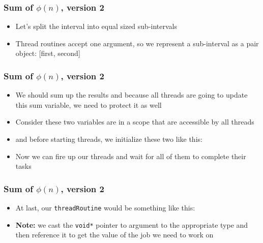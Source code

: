 \documentclass[aspectratio=43,11pt]{beamer}
\begin{document}
\begin{frame}
  \frametitle{Sum of $\phi(n)$, version 2}
  
  \begin{itemize}
    \item Let's split the interval into equal sized sub-intervals
    \item Thread routines accept one argument, so we represent a sub-interval as a
    pair object: [first, second]
  \end{itemize}
  
  
\end{frame}
\begin{frame}
  \frametitle{Sum of $\phi(n)$, version 2}
  
  \begin{itemize}
    \item We should sum up the results and because all threads are going to update this
    sum variable, we need to protect it as well
    \item Consider these two variables are in a scope that are accessible by all threads
    
    \item and before starting threads, we initialize these two like this:
    
    \item Now we can fire up our threads and wait for all of them to complete their tasks
    
  \end{itemize}
\end{frame}
\begin{frame}
  \frametitle{Sum of $\phi(n)$, version 2}
  
  \begin{itemize}
    \item At last, our {\tt threadRoutine} would be something like this:
    
    \item \textbf{Note:} we cast the {\tt void*} pointer to argument to the appropriate
    type and then reference it to get the value of the job we need to work on
  \end{itemize}
  
  \let\thefootnote\relax{}
\end{frame}
\end{document}
